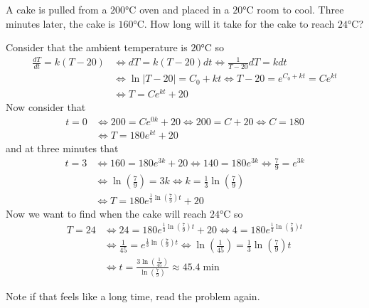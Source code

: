 \documentclass[notes]{subfiles}
\begin{document}
\begin{exercise}
    A cake is pulled from a $200\si{\celsius}$ oven and  placed in a $20\si{\celsius}$ room to cool. Three minutes later, the cake is $160\si{\celsius}$. How long will it take for the cake to reach $24\si{\celsius}$?
\end{exercise}
\begin{solution}
    Consider that the ambient temperature is $20\si{\celsius}$ so
    \begin{align*}
        \frac{dT}{dt} = k(T - 20)
        &\iff dT = k(T - 20)dt
        \iff \frac{1}{T - 20}dT = kdt \\
        &\iff \ln|T - 20| = C_0 + kt
        \iff T - 20 = e^{C_0 + kt} = Ce^{kt} \\
        &\iff T = Ce^{kt} + 20
    \end{align*}
    Now consider that
    \begin{align*}
        t = 0
        &\iff 200 = Ce^{0k} + 20
        \iff 200 = C + 20
        \iff C = 180 \\
        &\iff T = 180e^{kt} + 20
    \end{align*}
    and at three minutes that
    \begin{align*}
        t = 3
        &\iff 160 = 180e^{3k} + 20
        \iff 140 = 180e^{3k}
        \iff \frac{7}{9} = e^{3k} \\
        &\iff \ln\left(\frac{7}{9}\right) = 3k
        \iff k = \frac{1}{3}\ln\left(\frac{7}{9}\right) \\
        &\iff T = 180e^{\frac{1}{3}\ln\left(\frac{7}{9}\right)t} + 20
    \end{align*}
    Now we want to find when the cake will reach $24\si{\celsius}$ so
    \begin{align*}
        T = 24
        &\iff 24 = 180e^{\frac{1}{3}\ln\left(\frac{7}{9}\right)t} + 20
        \iff 4 = 180e^{\frac{1}{3}\ln\left(\frac{7}{9}\right)t} \\
        &\iff \frac{1}{45} = e^{\frac{1}{3}\ln\left(\frac{7}{9}\right)t}
        \iff \ln\left(\frac{1}{45}\right) = \frac{1}{3}\ln\left(\frac{7}{9}\right)t \\
        &\iff t = \frac{3\ln\left(\frac{1}{45}\right)}{\ln\left(\frac{7}{9}\right)} \approx 45.4\si{\min}
    \end{align*}
\end{solution}
Note if that feels like a long time, read the problem again.
\end{document}
